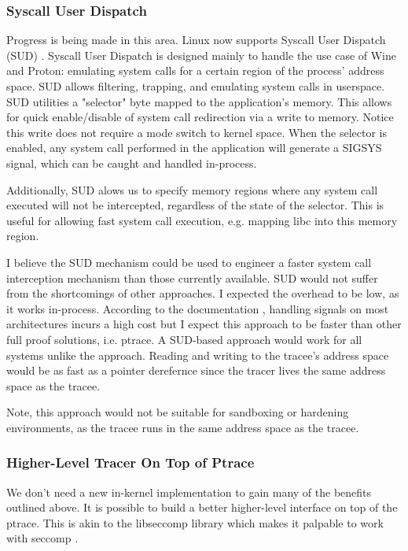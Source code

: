 \subsubsection{Syscall User Dispatch}
Progress is being made in this area. Linux now supports Syscall User Dispatch (SUD) \cite{sud}.
Syscall User Dispatch is designed mainly to handle the use case of Wine and Proton: emulating system calls for a certain region of the process' address space. SUD allows filtering, trapping, and emulating system calls in userspace. SUD utilities a "selector" byte mapped to the application's memory. This allows for quick enable/disable of system call redirection via a write to memory. Notice this write does not require a mode switch to kernel space. When the selector is enabled, any system call performed in the application will generate a SIGSYS signal, which can be caught and handled in-process. 

Additionally, SUD alows us to specify memory regions where any system call executed will not be intercepted, regardless of the state of the selector. This is useful for allowing fast system call execution, e.g. mapping libc into this memory region.

I believe the SUD mechanism could be used to engineer a faster system call interception mechanism than those currently available. SUD would not suffer from the shortcomings of other approaches. I expected the overhead to be low, as it works in-process. According to the documentation \cite{sud}, handling signals on most architectures incurs a high cost but I expect this approach to be faster than other full proof solutions, i.e. ptrace. A SUD-based approach would work for all systems unlike the  \ldpreload{} approach. Reading and writing to the tracee's address space would be as fast as a pointer derefernce since the tracer lives the same address space as the tracee.

Note, this approach would not be suitable for sandboxing or hardening environments, as the tracee runs in the same address space as the tracee.

\subsubsection{Higher-Level Tracer On Top of Ptrace} \label{sec:betterPtrace}
We don't need a new in-kernel implementation to gain many of the benefits outlined above. It is possible to build a better higher-level interface on top of the ptrace. This is akin to the libseccomp library which makes it palpable to work with seccomp \cite{libseccomp}.

